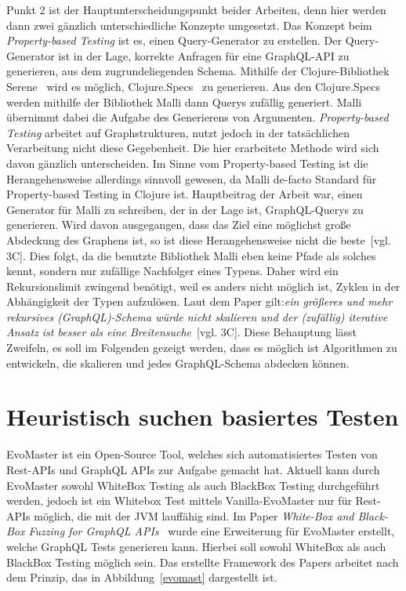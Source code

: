 Punkt 2 ist der Hauptunterscheidungspunkt beider Arbeiten, denn hier werden dann zwei gänzlich unterschiedliche Konzepte umgesetzt.
Das Konzept beim \textit{Property-based Testing} ist es, einen Query-Generator zu erstellen.
Der Query-Generator ist in der Lage, korrekte Anfragen für eine GraphQL-API zu generieren, aus dem zugrundeliegenden Schema.
Mithilfe der Clojure-Bibliothek Serene~\cite{clojureserene} wird es möglich, Clojure.Specs~\cite{clojurespec} zu generieren.
Aus den Clojure.Specs werden mithilfe der Bibliothek Malli\cite{clojuremalli} dann Querys zufällig generiert.
Malli übernimmt dabei die Aufgabe des Generierens von Argumenten.
\textit{Property-based Testing} arbeitet auf Graphstrukturen, nutzt jedoch in der tatsächlichen Verarbeitung nicht diese Gegebenheit.
Die hier erarbeitete Methode wird sich davon gänzlich unterscheiden.
Im Sinne vom Property-based Testing ist die Herangehensweise allerdings sinnvoll gewesen, da Malli\cite{clojuremalli} de-facto Standard für Property-based Testing in Clojure ist.
Hauptbeitrag der Arbeit war, einen Generator für Malli zu schreiben, der in der Lage ist, GraphQL-Querys zu generieren.
Wird davon ausgegangen, dass das Ziel eine möglichst große Abdeckung des Graphens ist, so ist diese Herangehensweise nicht die beste~\cite{property-based-testing}[vgl. 3C].
Dies folgt, da die benutzte Bibliothek Malli eben keine Pfade als solches kennt, sondern nur zufällige Nachfolger eines Typens.
Daher wird ein Rekursionslimit zwingend benötigt, weil es anders nicht möglich ist, Zyklen in der Abhängigkeit der Typen aufzulösen.
Laut dem Paper gilt:\textit{ein größeres und mehr rekursives (GraphQL)-Schema würde nicht skalieren und der (zufällig) iterative Ansatz ist besser als eine Breitensuche}~\cite{property-based-testing}[vgl. 3C].
Diese Behauptung lässt Zweifeln, es soll im Folgenden gezeigt werden, dass es möglich ist Algorithmen zu entwickeln, die skalieren und jedes GraphQL-Schema abdecken können.

\section{Heuristisch suchen basiertes Testen}

EvoMaster\cite{evo-master} ist ein Open-Source Tool, welches sich automatisiertes Testen von Rest-APIs und GraphQL APIs zur Aufgabe gemacht hat.
Aktuell kann durch EvoMaster sowohl WhiteBox Testing als auch BlackBox Testing durchgeführt werden, jedoch ist ein
Whitebox Test mittels Vanilla-EvoMaster nur für Rest-APIs möglich, die mit der JVM lauffähig sind.
Im Paper \textit{White-Box and Black-Box Fuzzing for GraphQL APIs}~\cite{belhadi2022whitebox} wurde eine Erweiterung für EvoMaster
erstellt, welche GraphQL Tests generieren kann.
Hierbei soll sowohl WhiteBox als auch BlackBox Testing möglich sein.
Das erstellte Framework des Papers arbeitet nach dem Prinzip, das in Abbildung~\ref{evomast} dargestellt ist.

